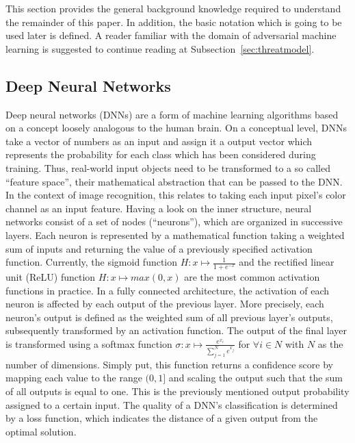 This section provides the general background knowledge required to understand the remainder of this paper.
In addition, the basic notation which is going to be used later is defined.
A reader familiar with the domain of adversarial machine learning is suggested to continue reading at Subsection~\ref{sec:threatmodel}.

\subsection{Deep Neural Networks}\label{subsec:dnn}
Deep neural networks (DNNs) are a form of machine learning algorithms based on a concept loosely analogous to the human brain.
On a conceptual level, DNNs take a vector of numbers as an input and assign it a output vector which represents the probability for each class which has been considered during training.
Thus, real-world input objects need to be transformed to a so called \enquote{feature space}, their mathematical abstraction that can be passed to the DNN.
In the context of image recognition, this relates to taking each input pixel's color channel as an input feature.
Having a look on the inner structure, neural networks consist of a set of nodes (\enquote{neurons}), which are organized in successive layers.
Each neuron is represented by a mathematical function taking a weighted sum of inputs and returning the value of a previously specified activation function.
Currently, the sigmoid function $H : x \mapsto \frac{1}{1 + e^{-x}}$ and the rectified linear unit (ReLU) function $H : x \mapsto max(0, x)$ are the most common activation functions in practice.
In a fully connected architecture, the activation of each neuron is affected by each output of the previous layer.
More precisely, each neuron's output is defined as the weighted sum of all previous layer's outputs, subsequently transformed by an activation function.
The output of the final layer is transformed using a softmax function $\sigma : x \mapsto \frac{e^{x_i}}{\sum_{j=1}^{N} e^{x_j}}$ for $\forall i \in N$ with $N$ as the number of dimensions.
Simply put, this function returns a confidence score by mapping each value to the range $(0, 1]$ and scaling the output such that the sum of all outputs is equal to one.
This is the previously mentioned output probability assigned to a certain input.
The quality of a DNN's classification is determined by a loss function, which indicates the distance of a given output from the optimal solution.

